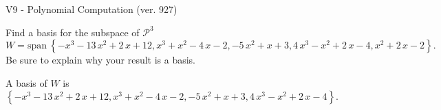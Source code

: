 \begin{exercise}
  \begin{exerciseTitle}V9 - Polynomial Computation (ver. 927)\end{exerciseTitle}
  \begin{exerciseStatement}
    Find a basis for the subspace of \(\mathcal{P}^3\) 
\[W=\mathrm{span}\ \left\{-x^{3} - 13 \, x^{2} + 2 \, x + 12 , x^{3} + x^{2} - 4 \, x - 2 , -5 \, x^{2} + x + 3 , 4 \, x^{3} - x^{2} + 2 \, x - 4 , x^{2} + 2 \, x - 2\right\}.\]
 Be sure to explain why your result is a basis.


  \end{exerciseStatement}
  \begin{exerciseAnswer}
   A basis of \(W\) is  \(\left\{-x^{3} - 13 \, x^{2} + 2 \, x + 12 , x^{3} + x^{2} - 4 \, x - 2 , -5 \, x^{2} + x + 3 , 4 \, x^{3} - x^{2} + 2 \, x - 4\right\}\).
  


  \end{exerciseAnswer}
\end{exercise}